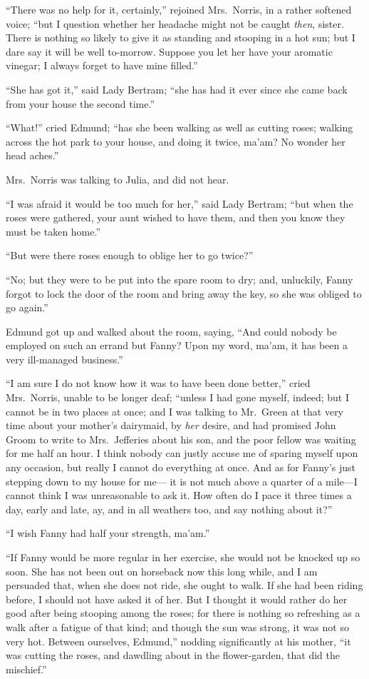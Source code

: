 \documentclass{article}
\begin{document}
``There was no help for it, certainly,'' rejoined Mrs.\ Norris,
in a rather softened voice; ``but I question whether her
headache might not be caught \emph{then}, sister.  There is
nothing so likely to give it as standing and stooping
in a hot sun; but I dare say it will be well to-morrow.
Suppose you let her have your aromatic vinegar; I always
forget to have mine filled.''

``She has got it,'' said Lady Bertram; ``she has had it ever
since she came back from your house the second time.''

``What!'' cried Edmund; ``has she been walking as well as
cutting roses; walking across the hot park to your house,
and doing it twice, ma'am?  No wonder her head aches.''

Mrs.\ Norris was talking to Julia, and did not hear.

``I was afraid it would be too much for her,'' said Lady Bertram;
``but when the roses were gathered, your aunt wished
to have them, and then you know they must be taken home.''

``But were there roses enough to oblige her to go twice?''

``No; but they were to be put into the spare room to dry;
and, unluckily, Fanny forgot to lock the door of the room
and bring away the key, so she was obliged to go again.''

Edmund got up and walked about the room, saying, ``And could
nobody be employed on such an errand but Fanny?  Upon my word,
ma'am, it has been a very ill-managed business.''

``I am sure I do not know how it was to have been done better,''
cried Mrs.\ Norris, unable to be longer deaf; ``unless I had
gone myself, indeed; but I cannot be in two places at once;
and I was talking to Mr.\ Green at that very time about
your mother's dairymaid, by \emph{her} desire, and had promised
John Groom to write to Mrs.\ Jefferies about his son,
and the poor fellow was waiting for me half an hour.
I think nobody can justly accuse me of sparing myself upon
any occasion, but really I cannot do everything at once.
And as for Fanny's just stepping down to my house for me---%
it is not much above a quarter of a mile---I cannot think I
was unreasonable to ask it.  How often do I pace it three
times a day, early and late, ay, and in all weathers too,
and say nothing about it?''

``I wish Fanny had half your strength, ma'am.''

``If Fanny would be more regular in her exercise, she would
not be knocked up so soon.  She has not been out on
horseback now this long while, and I am persuaded that,
when she does not ride, she ought to walk.  If she had
been riding before, I should not have asked it of her.
But I thought it would rather do her good after being
stooping among the roses; for there is nothing so
refreshing as a walk after a fatigue of that kind;
and though the sun was strong, it was not so very hot.
Between ourselves, Edmund,'' nodding significantly at
his mother, ``it was cutting the roses, and dawdling
about in the flower-garden, that did the mischief.''
\end{document}
